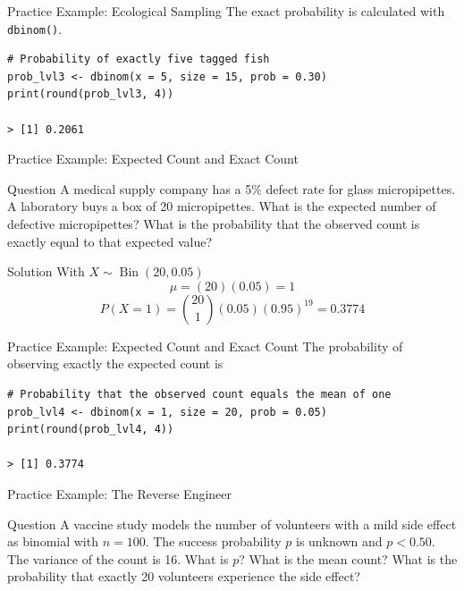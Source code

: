 \documentclass[aspectratio=169]{beamer}
\begin{document}
\begin{frame}[fragile]{Practice Example: Ecological Sampling}
The exact probability is calculated with \texttt{dbinom()}.

\begin{verbatim}
# Probability of exactly five tagged fish
prob_lvl3 <- dbinom(x = 5, size = 15, prob = 0.30)
print(round(prob_lvl3, 4))

> [1] 0.2061
\end{verbatim}
\end{frame}

\begin{frame}{Practice Example: Expected Count and Exact Count}
\begin{block}{Question}
A medical supply company has a 5\% defect rate for glass micropipettes. A laboratory buys a box of 20 micropipettes. What is the expected number of defective micropipettes? What is the probability that the observed count is exactly equal to that expected value?
\end{block}

\pause

\begin{block}{Solution}
With $X \sim \operatorname{Bin}(20,0.05)$
$$\mu=(20)(0.05)=1$$
$$P(X=1)=\binom{20}{1}(0.05)(0.95)^{19}=0.3774$$
\end{block}
\end{frame}

\begin{frame}[fragile]{Practice Example: Expected Count and Exact Count}
The probability of observing exactly the expected count is

\begin{verbatim}
# Probability that the observed count equals the mean of one
prob_lvl4 <- dbinom(x = 1, size = 20, prob = 0.05)
print(round(prob_lvl4, 4))

> [1] 0.3774
\end{verbatim}
\end{frame}

\begin{frame}{Practice Example: The Reverse Engineer}
\begin{block}{Question}
A vaccine study models the number of volunteers with a mild side effect as binomial with $n=100$. The success probability $p$ is unknown and $p<0.50$. The variance of the count is 16. What is $p$? What is the mean count? What is the probability that exactly 20 volunteers experience the side effect?
\end{block}
\end{frame}
\end{document}
